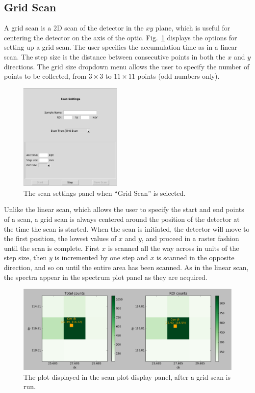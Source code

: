 \subsection{Grid Scan}

A grid scan is a 2D scan of the detector in the $xy$ plane, which is useful for
centering the detector on the axis of the optic. Fig.~\ref{fig:gridscan}
displays the options for setting up a grid scan. The user specifies the
accumulation time as in a linear scan. The step size is the distance between
consecutive points in both the $x$ and $y$ directions. The grid size dropdown
menu allows the user to specify the number of points to be collected, from $3
\times 3$ to $11 \times 11$ points (odd numbers only).

\begin{figure}
\centering \includegraphics[width=0.45\textwidth]{gridscan.png}
\caption{\label{fig:gridscan} The scan settings panel when ``Grid Scan'' is
  selected.}
\end{figure}

Unlike the linear scan, which allows the user to specify the start and end
points of a scan, a grid scan is always centered around the position of the
detector at the time the scan is started. When the scan is initiated, the
detector will move to the first position, the lowest values of $x$ and $y$, and
proceed in a raster fashion until the scan is complete. First $x$ is scanned all
the way across in units of the step size, then $y$ is incremented by one step
and $x$ is scanned in the opposite direction, and so on until the entire area
has been scanned. As in the linear scan, the spectra appear in the spectrum plot
panel as they are acquired.

\begin{figure}
\centering \includegraphics[width=\textwidth]{gridplot.png}
\caption{\label{fig:gridplot} The plot displayed in the scan plot display panel,
  after a grid scan is run.}
\end{figure}

